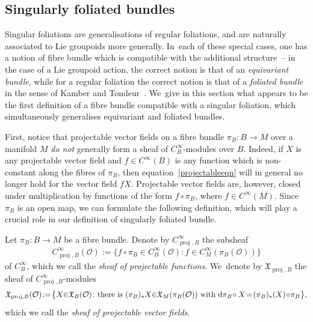 \documentclass[pdftex]{sigma}
\numberwithin{equation}{section}
\def\proj{\operatorname{proj}}
\def\OO{{\mathcal{O}}}
\def\XF{{\mathfrak{X}}}
\begin{document}
\subsection{Singularly foliated bundles}

Singular foliations are generalisations of regular foliations, and are naturally associated to Lie groupoids more generally. In~each of these special cases, one has a notion of fibre bundle which is compatible with the additional structure~-- in the case of a Lie groupoid action, the correct notion is that of an \textit{equivariant bundle}, while for a regular foliation the correct notion is that of a \textit{foliated bundle} in the sense of Kamber and Tondeur~\cite{folbund}. We~give in this section what appears to be the first definition of a fibre bundle compatible with a singular foliation, which simultaneously generalises equivariant and foliated bundles.

First, notice that projectable vector fields on a fibre bundle $\pi_{B}\colon B\rightarrow M$ over a manifold $M$ \textit{do not} generally form a sheaf of $C^{\infty}_{B}$-modules over $B$. Indeed, if $X$ is any projectable vector field and $f\in C^{\infty}(B)$ is any function which is non-constant along the fibres of $\pi_{B}$, then equation~\eqref{projectableeqn} will in general no longer hold for the vector field $fX$. Projectable vector fields are, however, closed under multiplication by functions of the form $f\circ\pi_{B}$, where $f\in C^{\infty}(M)$. Since $\pi_{B}$ is an open map, we can formulate the following definition, which will play a crucial role in our definition of singularly foliated bundle.

\begin{Definition}%
Let $\pi_{B}\colon B\rightarrow M$ be a fibre bundle. Denote by $C^{\infty}_{\proj,B}$ the subsheaf
\begin{gather*}
C^{\infty}_{\proj,B}(\OO):=\big\{f\circ\pi_{B}\in C^{\infty}_{B}(\OO)\colon f\in C^{\infty}_{M}(\pi_{B}(\OO))\big\}
\end{gather*}
of $C^{\infty}_{B}$, which we call the \textit{sheaf of projectable functions}. We~denote by $\XF_{\proj,B}$ the sheaf of $C^{\infty}_{\proj,B}$-modules
\begin{gather*}
\XF_{\proj,B}(\OO)\!:=\!\big\{X{\in}\XF_{B}(\OO)\colon \text{there is $(\pi_{B})_{*}X{\in}\XF_{M}(\pi_{B}(\OO))$ with ${\rm d}\pi_{B}\!\circ X\! = \! (\pi_{B})_{*}(X)\!\circ\!\pi_{B}$}\big\},
\end{gather*}
which we call the \textit{sheaf of projectable vector fields}.
\end{Definition}
\end{document}
